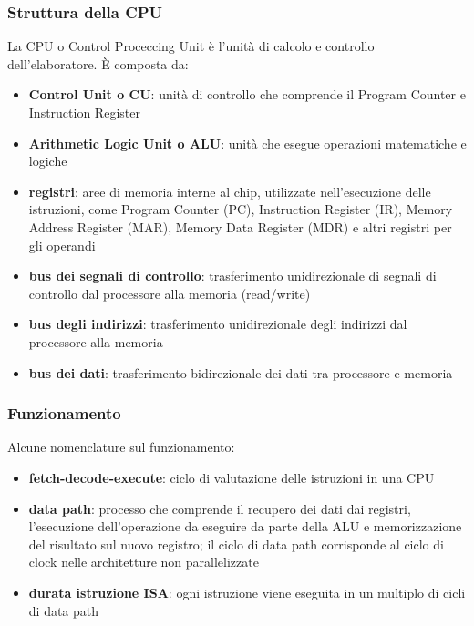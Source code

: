 \documentclass[a4paper]{article}
\begin{document}
\subsubsection*{Struttura della CPU}
La CPU o Control Proceccing Unit è l'unità di calcolo e controllo dell'elaboratore. È composta da:
\begin{itemize}
	\item \textbf{Control Unit o CU}: unità di controllo che comprende il Program Counter e Instruction Register
	\item \textbf{Arithmetic Logic Unit o ALU}: unità che esegue operazioni matematiche e logiche
	\item \textbf{registri}: aree di memoria interne al chip, utilizzate nell'esecuzione delle istruzioni, come Program Counter
	(PC), Instruction Register (IR), Memory Address Register (MAR), Memory Data Register (MDR) e altri registri per gli operandi
	\item \textbf{bus dei segnali di controllo}: trasferimento unidirezionale di segnali di controllo dal processore alla memoria (read/write)
	\item \textbf{bus degli indirizzi}: trasferimento unidirezionale degli indirizzi dal processore alla memoria
	\item \textbf{bus dei dati}: trasferimento bidirezionale dei dati tra processore e memoria
\end{itemize}

\subsubsection*{Funzionamento}
Alcune nomenclature sul funzionamento:
\begin{itemize}
	\item \textbf{fetch-decode-execute}: ciclo di valutazione delle istruzioni in una CPU
	\item \textbf{data path}: processo che comprende il recupero dei dati dai registri, l'esecuzione dell'operazione da eseguire
	da parte della ALU e memorizzazione del risultato sul nuovo registro; il ciclo di data path corrisponde al ciclo di clock nelle
	architetture non parallelizzate
	\item \textbf{durata istruzione ISA}: ogni istruzione viene eseguita in un multiplo di cicli di data path
\end{itemize}
\end{document}
